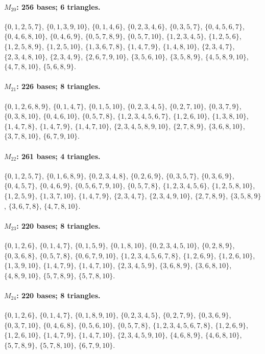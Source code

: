 \paragraph{$M_{20}$: 256 bases; 6 triangles.}
\(\{0,1,2,5,7\}\), \(\{0,1,3,9,10\}\), \(\{0,1,4,6\}\), \(\{0,2,3,4,6\}\), \(\{0,3,5,7\}\), \(\{0,4,5,6,7\}\), \(\{0,4,6,8,10\}\), \(\{0,4,6,9\}\), \(\{0,5,7,8,9\}\), \(\{0,5,7,10\}\), \(\{1,2,3,4,5\}\), \(\{1,2,5,6\}\), \(\{1,2,5,8,9\}\), \(\{1,2,5,10\}\), \(\{1,3,6,7,8\}\), \(\{1,4,7,9\}\), \(\{1,4,8,10\}\), \(\{2,3,4,7\}\), \(\{2,3,4,8,10\}\), \(\{2,3,4,9\}\), \(\{2,6,7,9,10\}\), \(\{3,5,6,10\}\), \(\{3,5,8,9\}\), \(\{4,5,8,9,10\}\), \(\{4,7,8,10\}\), \(\{5,6,8,9\}\).

\paragraph{$M_{21}$: 226 bases; 8 triangles.}
\(\{0,1,2,6,8,9\}\), \(\{0,1,4,7\}\), \(\{0,1,5,10\}\), \(\{0,2,3,4,5\}\), \(\{0,2,7,10\}\), \(\{0,3,7,9\}\), \(\{0,3,8,10\}\), \(\{0,4,6,10\}\), \(\{0,5,7,8\}\), \(\{1,2,3,4,5,6,7\}\), \(\{1,2,6,10\}\), \(\{1,3,8,10\}\), \(\{1,4,7,8\}\), \(\{1,4,7,9\}\), \(\{1,4,7,10\}\), \(\{2,3,4,5,8,9,10\}\), \(\{2,7,8,9\}\), \(\{3,6,8,10\}\), \(\{3,7,8,10\}\), \(\{6,7,9,10\}\).

\paragraph{$M_{22}$: 261 bases; 4 triangles.}
\(\{0,1,2,5,7\}\), \(\{0,1,6,8,9\}\), \(\{0,2,3,4,8\}\), \(\{0,2,6,9\}\), \(\{0,3,5,7\}\), \(\{0,3,6,9\}\), \(\{0,4,5,7\}\), \(\{0,4,6,9\}\), \(\{0,5,6,7,9,10\}\), \(\{0,5,7,8\}\), \(\{1,2,3,4,5,6\}\), \(\{1,2,5,8,10\}\), \(\{1,2,5,9\}\), \(\{1,3,7,10\}\), \(\{1,4,7,9\}\), \(\{2,3,4,7\}\), \(\{2,3,4,9,10\}\), \(\{2,7,8,9\}\), \(\{3,5,8,9\}\), \(\{3,6,7,8\}\), \(\{4,7,8,10\}\).

\paragraph{$M_{23}$: 220 bases; 8 triangles.}
\(\{0,1,2,6\}\), \(\{0,1,4,7\}\), \(\{0,1,5,9\}\), \(\{0,1,8,10\}\), \(\{0,2,3,4,5,10\}\), \(\{0,2,8,9\}\), \(\{0,3,6,8\}\), \(\{0,5,7,8\}\), \(\{0,6,7,9,10\}\), \(\{1,2,3,4,5,6,7,8\}\), \(\{1,2,6,9\}\), \(\{1,2,6,10\}\), \(\{1,3,9,10\}\), \(\{1,4,7,9\}\), \(\{1,4,7,10\}\), \(\{2,3,4,5,9\}\), \(\{3,6,8,9\}\), \(\{3,6,8,10\}\), \(\{4,8,9,10\}\), \(\{5,7,8,9\}\), \(\{5,7,8,10\}\).

\paragraph{$M_{24}$: 220 bases; 8 triangles.}
\(\{0,1,2,6\}\), \(\{0,1,4,7\}\), \(\{0,1,8,9,10\}\), \(\{0,2,3,4,5\}\), \(\{0,2,7,9\}\), \(\{0,3,6,9\}\), \(\{0,3,7,10\}\), \(\{0,4,6,8\}\), \(\{0,5,6,10\}\), \(\{0,5,7,8\}\), \(\{1,2,3,4,5,6,7,8\}\), \(\{1,2,6,9\}\), \(\{1,2,6,10\}\), \(\{1,4,7,9\}\), \(\{1,4,7,10\}\), \(\{2,3,4,5,9,10\}\), \(\{4,6,8,9\}\), \(\{4,6,8,10\}\), \(\{5,7,8,9\}\), \(\{5,7,8,10\}\), \(\{6,7,9,10\}\).

